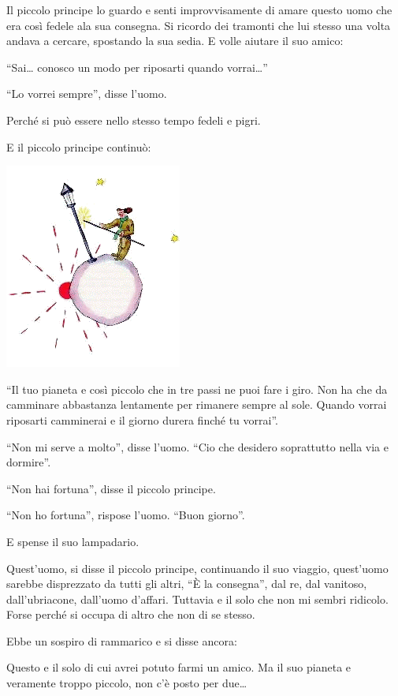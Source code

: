 \documentclass[11pt]{scrbook}
\begin{document}
Il piccolo principe lo guardo e senti improvvisamente di amare questo
uomo che era così fedele ala sua consegna. Si ricordo dei tramonti che
lui stesso una volta andava a cercare, spostando la sua sedia. E volle
aiutare il suo amico:

``Sai\ldots{} conosco un modo per riposarti quando vorrai\ldots{}''

``Lo vorrei sempre'', disse l'uomo.

Perché si può essere nello stesso tempo fedeli e pigri.

E il piccolo principe continuò:

\begin{center}
\includegraphics{img/14a}
\end{center}

``Il tuo pianeta e così piccolo che in tre passi ne puoi fare i giro.
Non ha che da camminare abbastanza lentamente per rimanere sempre al
sole. Quando vorrai riposarti camminerai e il giorno durera finché tu
vorrai''.

``Non mi serve a molto'', disse l'uomo. ``Cio che desidero soprattutto
nella via e dormire''.

``Non hai fortuna'', disse il piccolo principe.

``Non ho fortuna'', rispose l'uomo. ``Buon giorno''.

E spense il suo lampadario.

Quest'uomo, si disse il piccolo principe, continuando il suo viaggio,
quest'uomo sarebbe disprezzato da tutti gli altri, ``È la consegna'',
dal re, dal vanitoso, dall'ubriacone, dall'uomo d'affari. Tuttavia e il
solo che non mi sembri ridicolo. Forse perché si occupa di altro che non
di se stesso.

Ebbe un sospiro di rammarico e si disse ancora:

Questo e il solo di cui avrei potuto farmi un amico. Ma il suo pianeta e
veramente troppo piccolo, non c'è posto per due\ldots{}
\end{document}
